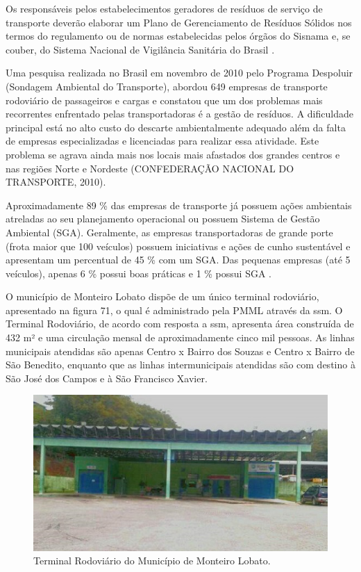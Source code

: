 	Os responsáveis pelos estabelecimentos geradores de resíduos de serviço de transporte deverão elaborar um Plano de Gerenciamento de Resíduos Sólidos nos termos do regulamento ou de normas estabelecidas pelos órgãos do Sisnama e, se couber, do Sistema Nacional de Vigilância Sanitária do Brasil \cite{brasil:12305}.
	
	Uma pesquisa realizada no Brasil em novembro de 2010 pelo Programa Despoluir (Sondagem Ambiental do Transporte), abordou 649 empresas de transporte rodoviário de passageiros e cargas e constatou que um dos problemas mais recorrentes enfrentado pelas transportadoras é a gestão de resíduos. A dificuldade principal está no alto custo do descarte ambientalmente adequado além da falta de empresas especializadas e licenciadas para realizar essa atividade. Este problema se agrava ainda mais nos locais mais afastados dos grandes centros e nas regiões Norte e Nordeste (CONFEDERAÇÃO NACIONAL DO TRANSPORTE, 2010).
	
	Aproximadamente 89 \% das empresas de transporte já possuem ações ambientais atreladas ao seu planejamento operacional ou possuem Sistema de Gestão Ambiental (SGA). Geralmente, as empresas transportadoras de grande porte (frota maior que 100 veículos) possuem iniciativas e ações de cunho sustentável e apresentam um percentual de 45 \% com um SGA. Das pequenas empresas (até 5 veículos), apenas 6 \% possui boas práticas e 1 \% possui SGA \cite{Paixao2011}.
	
	O município de Monteiro Lobato dispõe de um único terminal rodoviário, apresentado na figura 71, o qual é administrado pela PMML através da \gls{ssm}. O Terminal Rodoviário, de acordo com resposta a \gls{ssm}, apresenta área construída de 432 m² e uma circulação mensal de aproximadamente cinco mil pessoas. As linhas municipais atendidas são apenas Centro x Bairro dos Souzas e Centro x Bairro de São Benedito, enquanto que as linhas intermunicipais atendidas são com destino à São José dos Campos e à São Francisco Xavier.
	
	\begin{figure}
		\centering
		\includegraphics[width=0.75\linewidth]{produtos/prodtres/image086}
		\caption{Terminal Rodoviário do Município de Monteiro Lobato.}
		\label{fig:image086}
	\end{figure}
	
